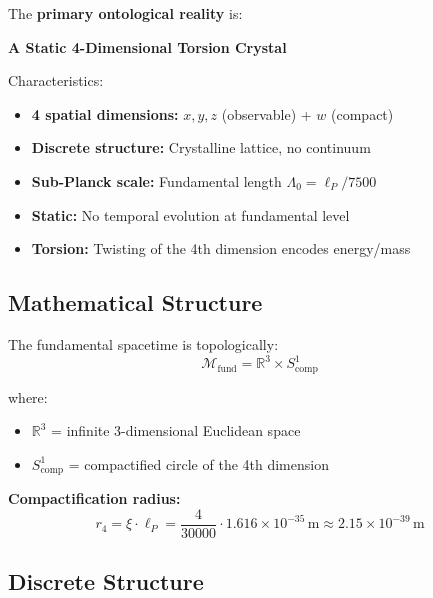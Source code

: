 	\begin{keyresult}
		The \textbf{primary ontological reality} is:
		
		\begin{center}
			\textbf{A Static 4-Dimensional Torsion Crystal}
		\end{center}
		
		\vspace{0.3cm}
		
		Characteristics:
		\begin{itemize}
			\item \textbf{4 spatial dimensions:} $x, y, z$ (observable) + $w$ (compact)
			\item \textbf{Discrete structure:} Crystalline lattice, no continuum
			\item \textbf{Sub-Planck scale:} Fundamental length $\Lambda_0 = \ell_P/7500$
			\item \textbf{Static:} No temporal evolution at fundamental level
			\item \textbf{Torsion:} Twisting of the 4th dimension encodes energy/mass
		\end{itemize}
	\end{keyresult}
	
	\subsection{Mathematical Structure}
	
	The fundamental spacetime is topologically:
	\begin{equation}
		\boxed{\mathcal{M}_{\text{fund}} = \mathbb{R}^3 \times S^1_{\text{comp}}}
	\end{equation}
	
	where:
	\begin{itemize}
		\item $\mathbb{R}^3$ = infinite 3-dimensional Euclidean space
		\item $S^1_{\text{comp}}$ = compactified circle of the 4th dimension
	\end{itemize}
	
	\textbf{Compactification radius:}
	\begin{equation}
		r_4 = \xi \cdot \ell_P = \frac{4}{30000} \cdot 1.616 \times 10^{-35}\,\text{m} \approx 2.15 \times 10^{-39}\,\text{m}
	\end{equation}
	
	\subsection{Discrete Structure}
	
